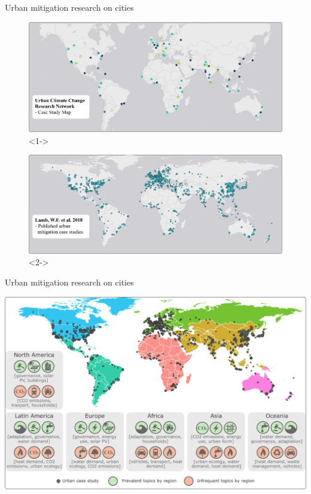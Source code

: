 \documentclass[9pt]{beamer}
\begin{document}
\begin{frame}{Urban mitigation research on cities}

\begin{figure}
	\includegraphics[width=0.8\linewidth]{images/empty_map}<1->
	
\end{figure}

\begin{figure}
	
	\includegraphics[width=0.8\linewidth]{images/full_map}<2->
\end{figure}

\end{frame}

\begin{frame}{Urban mitigation research on cities}

\includegraphics[width=\linewidth]{images/city_topics_map}

\citep{Lamb2018a}

\end{frame}
\end{document}
